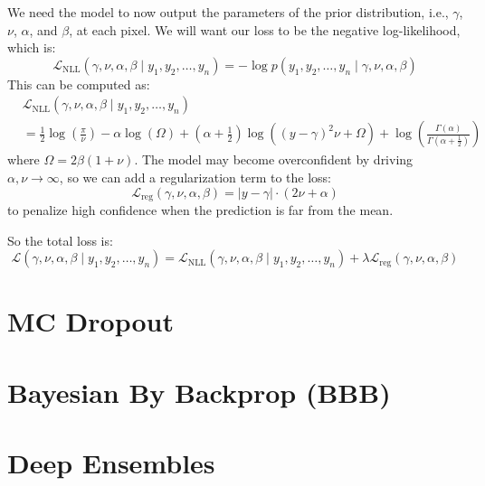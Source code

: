 \documentclass{article}
\newcommand{\f}{\frac}
\newcommand{\0}{\varnothing}
\theoremstyle{definition}
\begin{document}
We need the model to now output the parameters of the prior distribution, i.e., $\gamma$, $\nu$, $\alpha$, and $\beta$, at each pixel. We will want our loss to be the negative log-likelihood, which is:
$$\mathcal{L}_\mathrm{NLL}(\gamma, \nu, \alpha, \beta \mid y_1, y_2, \ldots, y_n) = -\log p(y_1, y_2, \ldots, y_n \mid \gamma, \nu, \alpha, \beta)$$
This can be computed as:
\begin{align*}
    &\mathcal{L}_\mathrm{NLL}(\gamma, \nu, \alpha, \beta \mid y_1, y_2, \ldots, y_n) \\
    &= \f{1}{2}\log\left(\f{\pi}{\nu}\right) - \alpha\log(\Omega) + \left(\alpha + \f{1}{2}\right)\log((y - \gamma)^2\nu + \Omega) + \log\left(\f{\Gamma(\alpha)}{\Gamma\left(\alpha + \f{1}{2}\right)}\right)
\end{align*}
where $\Omega = 2\beta(1 + \nu)$. The model may become overconfident by driving $\alpha,\nu \to \infty$, so we can add a regularization term to the loss:
$$\mathcal{L}_\mathrm{reg}(\gamma, \nu, \alpha, \beta) = |y - \gamma| \cdot (2\nu + \alpha)$$
to penalize high confidence when the prediction is far from the mean.

So the total loss is:
$$\mathcal{L}(\gamma, \nu, \alpha, \beta \mid y_1, y_2, \ldots, y_n) = \mathcal{L}_\mathrm{NLL}(\gamma, \nu, \alpha, \beta \mid y_1, y_2, \ldots, y_n) + \lambda\mathcal{L}_\mathrm{reg}(\gamma, \nu, \alpha, \beta)$$

\section{MC Dropout}

\section{Bayesian By Backprop (BBB)}

\section{Deep Ensembles}



\end{document}
